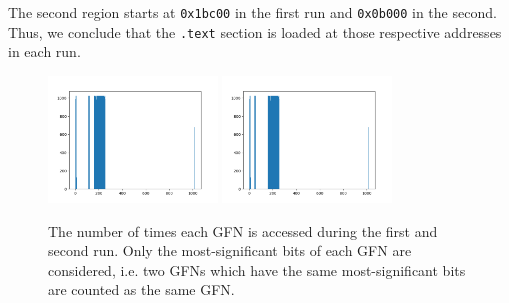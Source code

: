 \documentclass[sheet=1, english]{dexercise}
\begin{document}
\begin{enumerate}
    The second region starts at \texttt{0x1bc00} in the first run and
    \texttt{0x0b000} in the second. Thus, we conclude that the \texttt{.text}
    section is loaded at those respective addresses in each run.

    \begin{figure}
      \centering
      \includegraphics[width=0.4\textwidth]{run1.png}
      \includegraphics[width=0.4\textwidth]{run2.png}
      \caption{The number of times each GFN is accessed during the first and
        second run. Only the most-significant bits of each GFN are considered,
        i.e. two GFNs which have the same most-significant bits are counted as
        the same GFN.}
      \label{fig:runs}
    \end{figure}
\end{enumerate}
\end{document}
